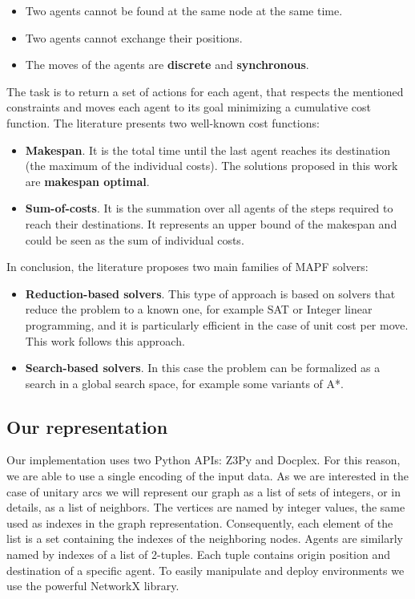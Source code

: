 \documentclass[12pt, a4paper, hidelinks]{article}
\numberwithin{equation}{section}
\begin{document}
\begin{itemize} 
\item Two agents cannot be found at the same node at the same time.
\item Two agents cannot exchange their positions.
\item The moves of the agents are \textbf{discrete} and \textbf{synchronous}.
\end{itemize}

The task is to return a set of actions for each agent, that respects the mentioned constraints and moves each agent to its goal minimizing a cumulative cost function. 
The literature presents two well-known cost functions:

\begin{itemize}
\item \textbf{Makespan}.
It is the total time until the last agent reaches its destination (the maximum of the individual costs).
The solutions proposed in this work are \textbf{makespan optimal}.
\item \textbf{Sum-of-costs}.
It is the summation over all agents of the steps required to reach their destinations. 
It represents an upper bound of the makespan and could be seen as the sum of individual costs.
\end{itemize}

In conclusion, the literature proposes two main families of MAPF solvers:

\begin{itemize}
\item \textbf{Reduction-based solvers}.
This type of approach is based on solvers that reduce the problem to a known one, for example SAT or Integer linear programming, and it is particularly efficient in the case of unit cost per move.
This work follows this approach.
\item \textbf{Search-based solvers}.
In this case the problem can be formalized as a search in a global search space, for example some variants of A*.
\end{itemize}

\subsection*{Our representation}
Our implementation uses two Python APIs: Z3Py and Docplex.
For this reason, we are able to use a single encoding of the input data.
As we are interested in the case of unitary arcs we will represent our graph as a list of sets of integers, or in details, as a list of neighbors.
The vertices are named by integer values, the same used as indexes in the graph representation.
Consequently, each element of the list is a set containing the indexes of the neighboring nodes.
Agents are similarly named by indexes of a list of 2-tuples.
Each tuple contains origin position and destination of a specific agent.
To easily manipulate and deploy environments we use the powerful NetworkX library.
\end{document}
